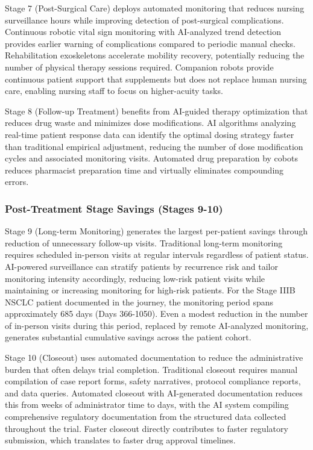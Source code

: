 Stage 7 (Post-Surgical Care) deploys automated monitoring that reduces nursing
surveillance hours while improving detection of post-surgical complications.
Continuous robotic vital sign monitoring with AI-analyzed trend detection
provides earlier warning of complications compared to periodic manual checks.
Rehabilitation exoskeletons accelerate mobility recovery, potentially reducing
the number of physical therapy sessions required. Companion robots provide
continuous patient support that supplements but does not replace human nursing
care, enabling nursing staff to focus on higher-acuity tasks.

Stage 8 (Follow-up Treatment) benefits from AI-guided therapy optimization
that reduces drug waste and minimizes dose modifications. AI algorithms
analyzing real-time patient response data can identify the optimal dosing
strategy faster than traditional empirical adjustment, reducing the number of
dose modification cycles and associated monitoring visits. Automated drug
preparation by cobots reduces pharmacist preparation time and virtually
eliminates compounding errors.

\subsubsection{Post-Treatment Stage Savings (Stages 9-10)}

Stage 9 (Long-term Monitoring) generates the largest per-patient savings
through reduction of unnecessary follow-up visits. Traditional long-term
monitoring requires scheduled in-person visits at regular intervals regardless
of patient status. AI-powered surveillance can stratify patients by recurrence
risk and tailor monitoring intensity accordingly, reducing low-risk patient
visits while maintaining or increasing monitoring for high-risk patients. For
the Stage IIIB NSCLC patient documented in the journey, the monitoring period
spans approximately 685 days (Days 366-1050). Even a modest reduction in the
number of in-person visits during this period, replaced by remote AI-analyzed
monitoring, generates substantial cumulative savings across the patient cohort.

Stage 10 (Closeout) uses automated documentation to reduce the administrative
burden that often delays trial completion. Traditional closeout requires manual
compilation of case report forms, safety narratives, protocol compliance
reports, and data queries. Automated closeout with AI-generated documentation
reduces this from weeks of administrator time to days, with the AI system
compiling comprehensive regulatory documentation from the structured data
collected throughout the trial. Faster closeout directly contributes to faster
regulatory submission, which translates to faster drug approval timelines.

